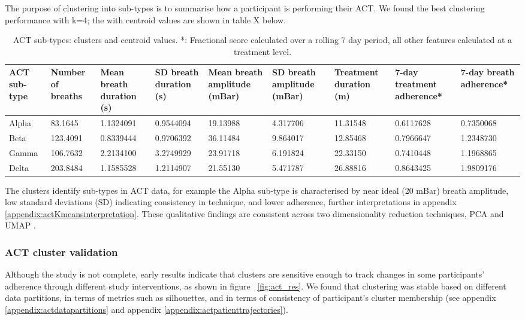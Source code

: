 \documentclass{article}
\begin{document}
The purpose of clustering into sub-types is to summarise how a participant is performing their ACT. We found the best clustering performance with k=4; the with centroid values are shown in table X below.


\begin{table}[H]
  \caption{ACT sub-types: clusters and centroid values. *: Fractional score calculated over a rolling 7 day period, all other features calculated at a treatment level.}
  \label{ACT_centroids}
  \centering
  \begin{tabularx}{17cm}{ X|X|X|X|X|X|X|X|X}
    \toprule
    \cmidrule(r){1-2}
    ACT sub-type & 
    Number of breaths & Mean breath duration (s) & SD breath duration (s) & Mean breath amplitude (mBar) &  SD breath amplitude (mBar) & Treatment duration (m) & 7-day treatment adherence* & 7-day breath adherence*  \\
    \midrule
    Alpha & 83.1645 & 1.1324091 & 0.9544094 & 19.13988 & 4.317706 & 11.31548 & 0.6117628 & 0.7350068\\
    Beta & 123.4091 & 0.8339444& 0.9706392 & 36.11484 & 9.864017 & 12.85468 & 0.7966647 & 1.2348730\\
    Gamma & 106.7632&     2.2134100 & 3.2749929 & 23.91718 & 6.191824 &  22.33150 &  0.7410448 &  1.1968865   \\
    Delta & 203.8484  &    1.1585528 & 1.2114907 &   21.55130 & 5.471787 & 26.88816 &  0.8643425 & 1.9809176 \\
    \bottomrule
    \end{tabularx}
\end{table}

The clusters identify sub-types in ACT data, for example the Alpha sub-type is characterised by near ideal (20 mBar) breath amplitude, low standard deviations (SD) indicating consistency in technique, and lower adherence, further interpretations in appendix \ref{appendix:actKmeansinterpretation}. These qualitative findings are consistent across two dimensionality reduction techniques, PCA and UMAP \cite{Mcinnes2018}. 

\subsubsection{ACT cluster validation }

Although the study is not complete, early results indicate that clusters are sensitive enough to track changes in some participants' adherence through different study interventions, as shown in figure ~\ref{fig:act_res}. We found that clustering was stable based on different data partitions, in terms of metrics such as silhouettes, and in terms of consistency of participant's cluster membership (see appendix \ref{appendix:actdatapartitions} and appendix \ref{appendix:actpatienttrajectories}).
\end{document}
